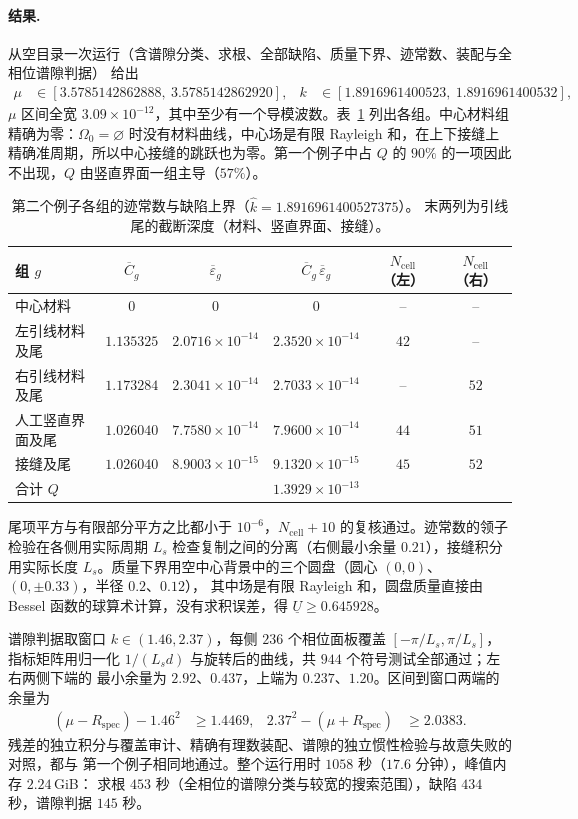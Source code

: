 \paragraph{结果.}
从空目录一次运行（含谱隙分类、求根、全部缺陷、质量下界、迹常数、装配与全相位谱隙判据）
给出
\begin{align*}
  \mu&\in[3.5785142862888,\ 3.5785142862920],
  &k&\in[1.8916961400523,\ 1.8916961400532],
\end{align*}
$\mu$ 区间全宽 $3.09\times10^{-12}$，其中至少有一个导模波数。表~\ref{tab:results-example2}
列出各组。中心材料组精确为零：$\Omega_0=\varnothing$ 时没有材料曲线，中心场是有限
Rayleigh 和，在上下接缝上精确准周期，所以中心接缝的跳跃也为零。第一个例子中占 $Q$ 的
$90\%$ 的一项因此不出现，$Q$ 由竖直界面一组主导（$57\%$）。
\begin{table}[htbp]
  \centering
  \caption{第二个例子各组的迹常数与缺陷上界（$\widehat k=1.8916961400527375$）。
  末两列为引线尾的截断深度（材料、竖直界面、接缝）。}
  \label{tab:results-example2}
  \begin{tabular}{lccccc}
    \toprule
    组 $g$ & $\overline C_g$ & $\overline\varepsilon_g$ & $\overline C_g\,\overline\varepsilon_g$ & $N_{\mathrm{cell}}$（左） & $N_{\mathrm{cell}}$（右）\\
    \midrule
    中心材料 & $0$ & $0$ & $0$ & -- & --\\
    左引线材料及尾 & $1.135325$ & $2.0716\times10^{-14}$ & $2.3520\times10^{-14}$ & $42$ & --\\
    右引线材料及尾 & $1.173284$ & $2.3041\times10^{-14}$ & $2.7033\times10^{-14}$ & -- & $52$\\
    人工竖直界面及尾 & $1.026040$ & $7.7580\times10^{-14}$ & $7.9600\times10^{-14}$ & $44$ & $51$\\
    接缝及尾 & $1.026040$ & $8.9003\times10^{-15}$ & $9.1320\times10^{-15}$ & $45$ & $52$\\
    \midrule
    合计 $Q$ & & & $1.3929\times10^{-13}$ & &\\
    \bottomrule
  \end{tabular}
\end{table}
尾项平方与有限部分平方之比都小于 $10^{-6}$，$N_{\mathrm{cell}}+10$ 的复核通过。迹常数的领子
检验在各侧用实际周期 $L_s$ 检查复制之间的分离（右侧最小余量 $0.21$），接缝积分用实际长度
$L_s$。质量下界用空中心背景中的三个圆盘（圆心 $(0,0)$、$(0,\pm0.33)$，半径 $0.2$、$0.12$），
其中场是有限 Rayleigh 和，圆盘质量直接由 Bessel 函数的球算术计算，没有求积误差，得
$\underline U\geq0.645928$。

谱隙判据取窗口 $k\in(1.46,2.37)$，每侧 $236$ 个相位面板覆盖 $[-\pi/L_s,\pi/L_s]$，
指标矩阵用归一化 $1/(L_sd)$ 与旋转后的曲线，共 $944$ 个符号测试全部通过；左右两侧下端的
最小余量为 $2.92$、$0.437$，上端为 $0.237$、$1.20$。区间到窗口两端的余量为
\begin{align*}
  (\mu-R_{\mathrm{spec}})-1.46^2&\geq1.4469,
  &2.37^2-(\mu+R_{\mathrm{spec}})&\geq2.0383.
\end{align*}
残差的独立积分与覆盖审计、精确有理数装配、谱隙的独立惯性检验与故意失败的对照，都与
第一个例子相同地通过。整个运行用时 $1058$ 秒（$17.6$ 分钟），峰值内存 $2.24$\,GiB：
求根 $453$ 秒（全相位的谱隙分类与较宽的搜索范围），缺陷 $434$ 秒，谱隙判据 $145$ 秒。

